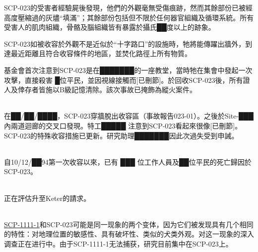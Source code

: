 SCP-023的受害者經驗屍後發現，他們的外觀毫無受傷痕跡，然而其餘部份已被經高度壓縮過的灰燼“填滿”；其餘部份包括但不限於任何器官組織及循環系統。所有受害人的肌肉組織，骨骼及腦組織皆有暴露於攝氏██度以上的跡象。

SCP-023如被收容於外觀不是近似於“十字路口”的設施時，牠將能傳躍出牆外，到達最近距離且符合收容條件的地區，並焚化路徑上所有物質。

基金會首次注意到SCP-023是在███████的一座教堂，當時牠在集會中發起一次攻擊，直接殺害 █位平民，並因視線接觸而[已刪節]。於回收SCP-023後，所有證人及倖存者皆施以B級記憶清除。該次事故已掩飾為縱火案件。

\\
在██\slash ██\slash ████，SCP-023穿牆脫出收容區（事故報告023-01）。之後於Site-███內兩道迴廊的交叉口發現。特工█████ 注意到SCP-023看起來很像[已刪節]。SCP-023的特殊收容措施已更新。研究助理███████因此次過失受到申誡。

\\
自10\slash 12\slash ██94第一次收容以來，已有 ███ 位工作人員及██位平民的死亡歸因於SCP-023。

\\
正在評估升至Keter的請求。

\\\hyperref[chap:SCP-1111]{SCP-1111-1}和SCP-023可能是同一现象的两个变体，因为它们被发现具有几个相同的特性：对地理位置的敏感性、具有破坏性、类似的犬类外观。对这一现象的深入调查正在进行中。由于SCP-1111-1无法捕获，研究目前集中在SCP-023上。
